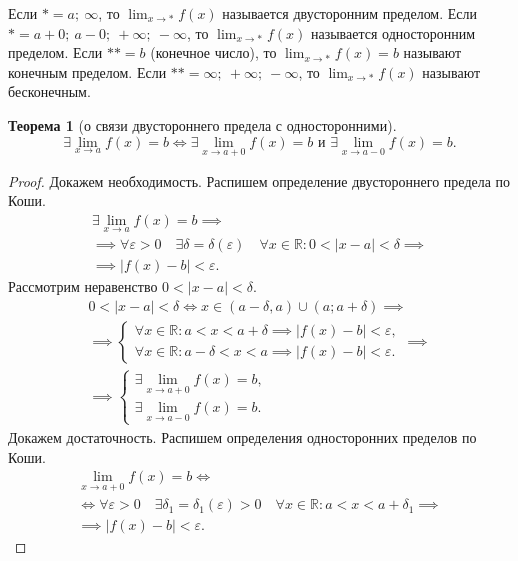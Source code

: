 \documentclass[a4paper,12pt]{article} %
\newtheorem{theorem}{Теорема}[section]
\theoremstyle{remark}
\theoremstyle{definition}
\begin{document}
	Если $* = a; \ \infty$, то $\lim_{x \to *} f(x)$ называется двусторонним пределом.
	Если $* = a+0; \ a-0;\ +\infty;\ -\infty$, то $\lim_{x \to *} f(x)$ называется односторонним пределом.
	Если $** = b$ (конечное число), то $\lim_{x \to *} f(x) = b$ называют конечным пределом.
	Если $** = \infty;\ +\infty;\ -\infty$, то $\lim_{x \to *} f(x)$ называют бесконечным.

\begin{theorem}[о связи двустороннего предела с односторонними]
	\[
		\exists \lim_{x \to a} f(x) = b \iff \exists \lim_{x \to a+0} f(x) = b \text{ и } \exists \lim_{x \to a-0} f(x) = b
	.\]
\end{theorem}
\begin{proof}
	Докажем необходимость. Распишем определение двустороннего предела по Коши.
	\begin{multline}
		\exists  \lim_{x \to a} f(x) = b \implies \\
		\implies \forall \varepsilon>0 \quad \exists \delta=\delta(\varepsilon) \quad \forall x\in \mathbb{R} : 0 < |x-a| < \delta \implies \\
		\implies |f(x) - b| < \varepsilon.
	\end{multline}	
	Рассмотрим неравенство $0 < |x-a| < \delta$.
	\begin{multline}
		0 < |x-a| < \delta \iff x \in (a-\delta, a) \cup (a; a + \delta) \implies \\
		\implies \begin{cases}
			\forall x \in  \mathbb{R} : a < x < a+\delta \implies |f(x)-b|<\varepsilon, \\
			\forall x \in  \mathbb{R} : a-\delta < x < a \implies |f(x)-b|<\varepsilon.
		\end{cases} \implies \\
		\implies \begin{cases}
			\exists \lim_{x \to a+0} f(x) = b, \\
			\exists \lim_{x \to a-0} f(x) = b.
		\end{cases}
	\end{multline}
	Докажем достаточность. Распишем определения односторонних пределов по Коши.
	\begin{multline}
		\lim_{x \to a+0} f(x) = b \iff \\
		\iff \forall \varepsilon>0 \quad \exists \delta_1 = \delta_1(\varepsilon)>0 \quad \forall x\in \mathbb{R} : a < x < a+\delta_1 \implies \\
		\implies |f(x) - b| < \varepsilon.
	\end{multline}

\end{proof}
\end{document}
